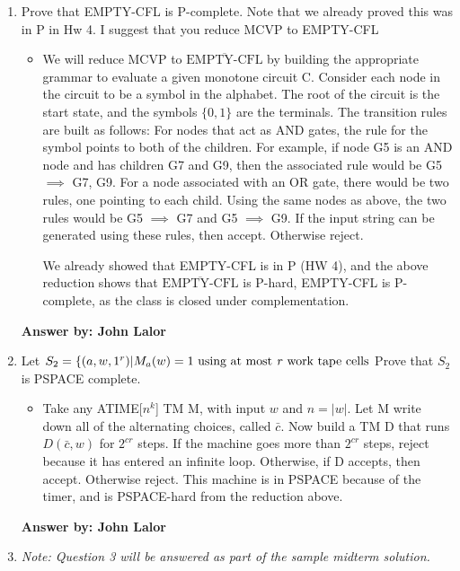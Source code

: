 \documentclass[12pt]{article}
\begin{document}
\noindent{}
\addtocounter{section}{1}

\begin{enumerate}

\item Prove that EMPTY-CFL is P-complete. Note that we already proved this was in P in Hw 4. I suggest that you reduce MCVP to EMPTY-CFL

\begin{itemize}

\item We will reduce MCVP to $\overline{\textrm{EMPTY-CFL}}$ by building the appropriate grammar to evaluate a given monotone circuit C. Consider each node in the circuit to be a symbol in the alphabet. The root of the circuit is the start state, and the symbols $\{0,1\}$ are the terminals. The transition rules are built as follows: For nodes that act as AND gates, the rule for the symbol points to both of the children. For example, if node G5 is an AND node and has children G7 and G9, then the associated rule would be G5 $\implies$ G7, G9. For a node associated with an OR gate, there would be two rules, one pointing to each child. Using the same nodes as above, the two rules would be G5 $\implies$ G7 and G5 $\implies$ G9. If the input string can be generated using these rules, then accept. Otherwise reject.

We already showed that EMPTY-CFL is in P (HW 4), and the above reduction shows that $\overline{\textrm{EMPTY-CFL}}$ is P-hard, EMPTY-CFL is P-complete, as the class is closed under complementation.

\end{itemize}

{\bf Answer by: John Lalor} 

\item Let $S_2 = \{(a,w,1^r) | M_a(w) = 1 \textrm{ using at most \textit{r} work tape cells}$ Prove that $S_2$ is PSPACE complete.


\begin{itemize}

\item Take any ATIME[$n^k$] TM M, with input $w$ and $n = |w|$. Let M write down all of the alternating choices, called $\bar{c}$. Now build a TM D that runs $D(\bar{c},w)$ for $2^{cr}$ steps. If the machine goes more than $2^{cr}$ steps, reject because it has entered an infinite loop. Otherwise, if D accepts, then accept. Otherwise reject. This machine is in PSPACE because of the timer, and is PSPACE-hard from the reduction above. 

\end{itemize}


{\bf Answer by: John Lalor} 

\item \textit{Note: Question 3 will be answered as part of the sample midterm solution.}

\end{enumerate}
\end{document}
